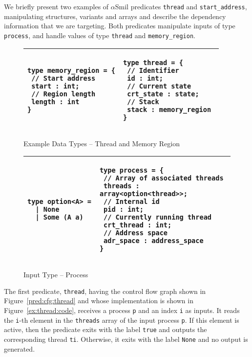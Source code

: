 \documentclass[11pt]{article}
\newcommand{\disp}[1]{\lstinline&#1&}
\def\asmil{\textsf{$\alpha$Smil}}
\begin{document}
We briefly present two examples of {\asmil} predicates \disp{thread}
and \disp{start_address}, 
manipulating structures, variants and arrays and describe the dependency 
information that we are targeting.
Both predicates manipulate inputs of type
\disp{process},  and handle values of type \disp{thread} and
\disp{memory_region}. 

\begin{figure}[hbtp]\centering
\begin{tabular}{ll}
\toprule
\begin{lstlisting}
type memory_region = {
 // Start address 
 start : int;  
 // Region length 
 length : int
}
\end{lstlisting}
&\begin{lstlisting}
type thread = {
 // Identifier
 id : int;
 // Current state 
 crt_state : state;
 // Stack 
 stack : memory_region 
}
\end{lstlisting} \\
\bottomrule
\end{tabular}
\caption{Example Data Types -- Thread and Memory Region}
\label{ex:atype}
\end{figure}

\begin{figure}[hbtp]\centering
\begin{tabular}{ll}
\toprule
\begin{lstlisting}
type option<A> = 
  | None
  | Some (A a)
\end{lstlisting}
&\begin{lstlisting}
type process = {
 // Array of associated threads 
 threads : array<option<thread>>;
 // Internal id
 pid : int; 
 // Currently running thread 
 crt_thread : int;
 // Address space 
 adr_space : address_space
}
\end{lstlisting}
\\
\bottomrule
\end{tabular}
\caption{Input Type -- Process}
\label{ex:itype}
\end{figure}
  
The first predicate, \disp{thread}, having the control flow graph shown in 
Figure~\ref{pred:cfg:thread} and whose implementation is shown in 
Figure~\ref{ex:thread:code}, receives a process \disp{p} and an index \disp{i} 
as inputs. It reads the \disp{i}-th element in the \disp{threads} array of the 
input process \disp{p}. If this element is active, then the predicate exits with   
the label \disp{true} and outputs the corresponding thread \disp{ti}. Otherwise, 
it exits with the label \disp{None} and no output is generated.
\end{document}
